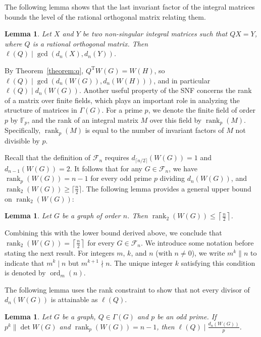 \documentclass[12pt]{article}
\theoremstyle{plain}
\newtheorem{lemma}[theorem]{Lemma}
\theoremstyle{definition}
\newcommand{\trans}{^{\mathrm{T}}}
\begin{document}
The following lemma shows that the last invariant factor of the integral matrices bounds the level of the rational orthogonal matrix relating them.

\begin{lemma}
\label{lemma:level-dn}
\cite{qiu2023smith}
Let $X$ and $Y$ be two non-singular integral matrices such that $QX = Y$, where $Q$ is a rational orthogonal matrix. Then $\ell(Q) \mid \gcd(d_n(X),d_n(Y))$.
\end{lemma}

By Theorem~\ref{theorem:q}, $Q\trans W(G) = W(H)$, so $\ell(Q) \mid \operatorname{gcd}(d_n(W(G)), d_n(W(H)))$, and in particular $\ell(Q) \mid d_n(W(G))$. Another useful property of the SNF concerns the rank of a matrix over finite fields, which plays an important role in analyzing the structure of matrices in $\Gamma(G)$. For a prime $p$, we denote the finite field of order $p$ by $\mathbb{F}_p$, and the rank of an integral matrix $M$ over this field by $\operatorname{rank}_p(M)$. Specifically, $\operatorname{rank}_p(M)$ is equal to the number of invariant factors of $M$ not divisible by $p$.

Recall that the definition of $\mathcal{F}_n$ requires $d_{\lceil n/2 \rceil}(W(G)) = 1$ and $d_{n-1}(W(G)) = 2$. It follows that for any $G \in \mathcal{F}_n$, we have $\operatorname{rank}_p(W(G)) = n-1$ for every odd prime $p$ dividing $d_n(W(G))$, and $\operatorname{rank}_2(W(G)) \ge \lceil \frac{n}{2} \rceil$. The following lemma provides a general upper bound on $\operatorname{rank}_2(W(G))$:

\begin{lemma}{\cite{wang2017simple}}
\label{lemma:wang-rank2}
Let $G$ be a graph of order $n$. Then $\operatorname{rank}_2(W(G)) \leq \left\lceil \frac{n}{2} \right\rceil$.
\end{lemma}

Combining this with the lower bound derived above, we conclude that $\operatorname{rank}_2(W(G))=\left\lceil \frac{n}{2} \right\rceil$ for every $G \in \mathcal{F}_n$. We introduce some notation before stating the next result. For integers $m$, $k$, and $n$ (with $n \neq 0$), we write $m^k \parallel n$ to indicate that $m^k \mid n$ but $m^{k+1} \nmid n$. The unique integer $k$ satisfying this condition is denoted by $\operatorname{ord}_m(n)$.

The following lemma uses the rank constraint to show that not every divisor of $d_n(W(G))$ is attainable as $\ell(Q)$.

\begin{lemma}
\label{lemma:pk-out}
\cite{qiu2023smith}
Let $G$ be a graph, $ Q \in \Gamma(G) $ and $ p $ be an odd prime. If $p^k \parallel \det{W(G)}$ and $\operatorname{rank}_p(W(G)) = n-1$, then $\ell(Q) \mid \frac{d_n(W(G))}{p} $.
\end{lemma}
\end{document}
